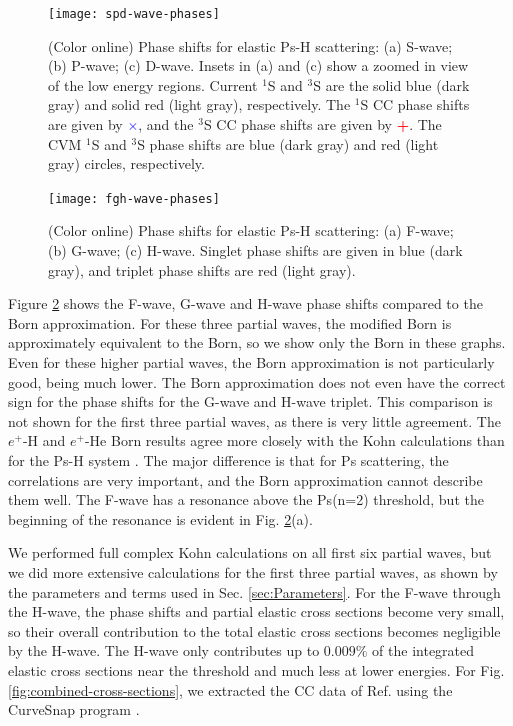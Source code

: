 \documentclass[preprint,showpacs,preprintnumbers,amsmath,amssymb,longbibliography,pra,aps]{revtex4-1}
\begin{document}
\begin{figure}[H]
	\centering
	\texttt{[image: spd-wave-phases]}
	\caption{(Color online) Phase shifts for elastic Ps-H scattering: (a) S-wave; (b) P-wave; (c) D-wave. Insets in (a) and (c) show a zoomed in view of the low energy regions. Current $^1$S and $^3$S are the solid blue (dark gray) and solid red (light gray), respectively. The $^1$S CC phase shifts \cite{Walters2004} are given by \mbox{\textcolor{blue}{$\times$}}, and the $^3$S CC phase shifts \cite{Blackwood2002} are given by \mbox{\textcolor{red}{\textbf{+}}}. The CVM $^1$S and $^3$S phase shifts \cite{Zhang2012} are blue (dark gray) and red (light gray) circles, respectively.}
	\label{fig:spd-wave-phases}
\end{figure}

\begin{figure}[H]
	\centering
	\texttt{[image: fgh-wave-phases]}
	\caption{(Color online) Phase shifts for elastic Ps-H scattering: (a) F-wave; (b) G-wave; (c) H-wave. Singlet phase shifts are given in blue (dark gray), and triplet phase shifts are red (light gray).}
	\label{fig:fgh-wave-phases}
\end{figure}

Figure \ref{fig:fgh-wave-phases} shows the F-wave, G-wave and H-wave phase shifts compared to the Born approximation. For these three partial waves, the modified Born is approximately equivalent to the Born, so we show only the Born in these graphs. Even for these higher partial waves, the Born approximation is not particularly good, being much lower. The Born approximation does not even have the correct sign for the phase shifts for the G-wave and H-wave triplet. This comparison is not shown for the first three partial waves, as there is very little agreement. The $e^+$-H and $e^+$-He Born results agree more closely with the Kohn calculations than for the Ps-H system \cite{?}. The major difference is that for Ps scattering, the correlations are very important, and the Born approximation cannot describe them well. The F-wave has a resonance above the Ps(n=2) threshold, but the beginning of the resonance is evident in Fig. \ref{fig:fgh-wave-phases}(a).

We performed full complex Kohn calculations on all first six partial waves, but we did more extensive calculations for the first three partial waves, as shown by the parameters and terms used in Sec. \ref{sec:Parameters}. For the F-wave through the H-wave, the phase shifts and partial elastic cross sections become very small, so their overall contribution to the total elastic cross sections becomes negligible by the H-wave. The H-wave only contributes up to $0.009\%$ of the integrated elastic cross sections near the threshold and much less at lower energies. For Fig. \ref{fig:combined-cross-sections}, we extracted the CC data of Ref. \cite{Walters2004} using the CurveSnap program \cite{CurveSnap}.
\end{document}

